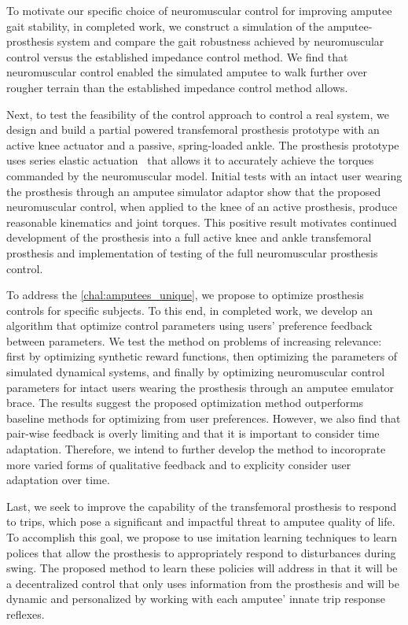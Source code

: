 To motivate our specific choice of neuromuscular control for improving amputee
gait stability, in completed work, we construct a simulation of the
amputee-prosthesis system and compare the gait robustness achieved by
neuromuscular control versus the established impedance control method. We find
that neuromuscular control enabled the simulated amputee to walk further over
rougher terrain than the established impedance control method allows.

Next, to test the feasibility of the control approach to control a real system,
we design and build a partial powered transfemoral prosthesis prototype with an
active knee actuator and a passive, spring-loaded ankle. The prosthesis
prototype uses series elastic actuation~\citep{pratt1995series} that allows it
to accurately achieve the torques commanded by the neuromuscular model. Initial
tests with an intact user wearing the prosthesis through an amputee simulator
adaptor show that the proposed neuromuscular control, when applied to the knee
of an active prosthesis, produce reasonable kinematics and joint torques. This
positive result motivates continued development of the prosthesis into a full
active knee and ankle transfemoral prosthesis and implementation of testing of
the full neuromuscular prosthesis control.

To address the \cref{chal:amputees_unique}, we propose to optimize prosthesis
controls for specific subjects. To this end, in completed work, we develop an
algorithm that optimize control parameters using users' preference feedback
between parameters. We test the method on problems of increasing relevance:
first by optimizing synthetic reward functions, then optimizing the parameters
of simulated dynamical systems, and finally by optimizing neuromuscular control
parameters for intact users wearing the prosthesis through an amputee emulator
brace. The results suggest the proposed optimization method outperforms baseline
methods for optimizing from user preferences. However, we also find that
pair-wise feedback is overly limiting and that it is important to consider time
adaptation. Therefore, we intend to further develop the method to incoroprate
more varied forms of qualitative feedback and to explicity consider user
adaptation over time.

Last, we seek to improve the capability of the transfemoral prosthesis to
respond to trips, which pose a significant and impactful threat to amputee
quality of life. To accomplish this goal, we propose to use imitation learning
techniques \citep{argall2009survey} to learn polices that allow the prosthesis
to appropriately respond to disturbances during swing.  The proposed method to
learn these policies will address 
in that it will be a decentralized control that only uses information from the
prosthesis and will be dynamic and personalized by working with each amputee'
innate trip response reflexes.

